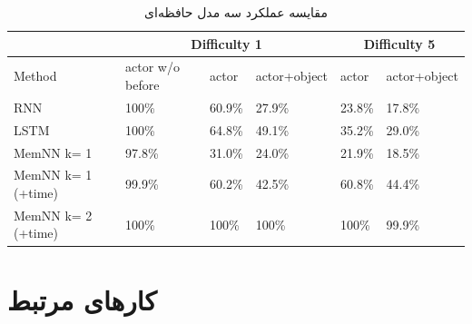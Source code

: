 \documentclass[12pt, a4paper, oneside]{report}
\begin{document}
\begin{table}[h]
    \begin{center}
      \begin{latin}
      \begin{tabular}{|l||l|l|l||l|l|}
        \hline
         & \multicolumn{3}{c|}{Difficulty 1} & \multicolumn{2}{c|}{Difficulty 5} \\
        \hline
        Method & actor w/o before & actor & actor+object & actor & actor+object \\
        \hline
        RNN & 100\% & 60.9\% & 27.9\% & 23.8\% & 17.8\% \\
        LSTM & 100\% & 64.8\% & 49.1\% & 35.2\% & 29.0\% \\
        \hline
        MemNN k= 1 & 97.8\% & 31.0\% & 24.0\% & 21.9\% & 18.5\% \\
        MemNN k= 1 (+time) & 99.9\% & 60.2\% & 42.5\% & 60.8\% & 44.4\% \\
        MemNN k= 2 (+time) & 100\% & 100\% & 100\% & 100\% & 99.9\% \\
        \hline
      \end{tabular}
      \end{latin}
      \caption{مقایسه عملکرد سه مدل حافظه‌ای}
      \label{tab:MemNN-vs-others}
    \end{center}
  \end{table}


\chapter{کارهای مرتبط}
\pagebreak

\end{document}

